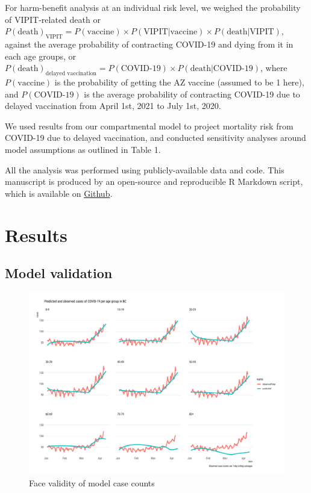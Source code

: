 \documentclass[]{interact}
\theoremstyle{plain}%
\theoremstyle{definition}
\theoremstyle{remark}
\begin{document}
For harm-benefit analysis at an individual risk level, we weighed the
probability of VIPIT-related death or
\(P(\text{death})_{\text{VIPIT}} = P(\text{vaccine}) \times P(\text{VIPIT}|\text{vaccine}) \times P(\text{death}|\text{VIPIT})\),
against the average probability of contracting COVID-19 and dying from
it in each age groups, or
\(P(\text{death})_{\text{delayed vaccination}} = P(\text{COVID-19}) \times P(\text{death}|\text{COVID-19})\),
where \(P(\text{vaccine})\) is the probability of getting the AZ vaccine
(assumed to be 1 here), and \(P(\text{COVID-19})\) is the average
probability of contracting COVID-19 due to delayed vaccination from
April 1st, 2021 to July 1st, 2020.

We used results from our compartmental model to project mortality risk
from COVID-19 due to delayed vaccination, and conducted sensitivity
analyses around model assumptions as outlined in Table 1.

All the analysis was performed using publicly-available data and code.
This manuscript is produced by an open-source and reproducible R
Markdown script, which is available on
\href{https://github.com/aminadibi/astrazenecaVIPIT}{Github}.

\hypertarget{results}{%
\section{Results}\label{results}}

\hypertarget{model-validation}{%
\subsection{Model validation}\label{model-validation}}

\begin{figure}

{\centering \includegraphics[width=1\linewidth]{../figures/fig-validation} 

}

\caption{Face validity of model case counts}\label{fig:figValidation}
\end{figure}
\end{document}
